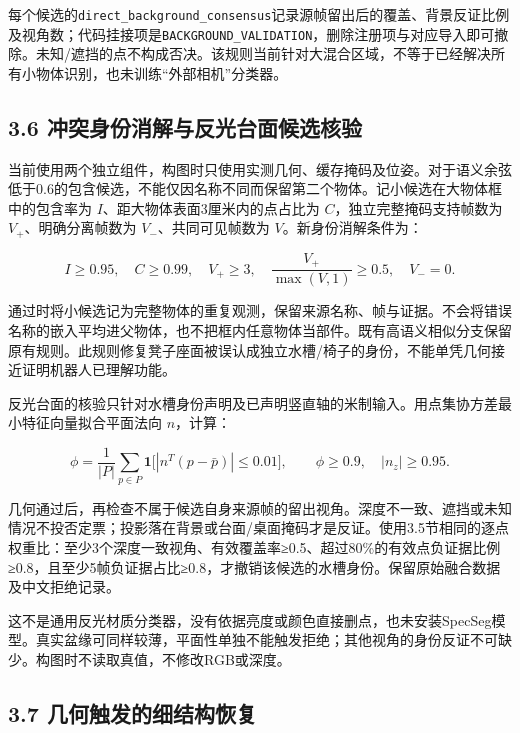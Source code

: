 \documentclass[UTF8,fontset=fandol]{ctexart}
\begin{document}
每个候选的\texttt{direct\_\allowbreak{}background\_\allowbreak{}consensus}记录源帧留出后的覆盖、背景反证比例及视角数；代码挂接项是\texttt{BACKGROUND\_\allowbreak{}VALIDATION}，删除注册项与对应导入即可撤除。未知/遮挡的点不构成否决。该规则当前针对大混合区域，不等于已经解决所有小物体识别，也未训练“外部相机”分类器。



\subsection*{3.6 冲突身份消解与反光台面候选核验}

当前使用两个独立组件，构图时只使用实测几何、缓存掩码及位姿。对于语义余弦低于0.6的包含候选，不能仅因名称不同而保留第二个物体。记小候选在大物体框中的包含率为 $I$、距大物体表面3厘米内的点占比为 $C$，独立完整掩码支持帧数为 $V_+$、明确分离帧数为 $V_-$、共同可见帧数为 $V$。新身份消解条件为：



\[
I\ge0.95,\quad C\ge0.99,\quad V_+\ge3,\quad
\frac{V_+}{\max(V,1)}\ge0.5,\quad V_-=0.
\]

通过时将小候选记为完整物体的重复观测，保留来源名称、帧与证据。不会将错误名称的嵌入平均进父物体，也不把框内任意物体当部件。既有高语义相似分支保留原有规则。此规则修复凳子座面被误认成独立水槽/椅子的身份，不能单凭几何接近证明机器人已理解功能。



反光台面的核验只针对水槽身份声明及已声明竖直轴的米制输入。用点集协方差最小特征向量拟合平面法向 $n$，计算：



\[
\phi=\frac{1}{|P|}\sum_{p\in P}\mathbf1\bigl[|n^T(p-\bar p)|\le0.01\bigr],
\qquad \phi\ge0.9,\quad |n_z|\ge0.95.
\]

几何通过后，再检查不属于候选自身来源帧的留出视角。深度不一致、遮挡或未知情况不投否定票；投影落在背景或台面/桌面掩码才是反证。使用3.5节相同的逐点权重比：至少3个深度一致视角、有效覆盖率≥0.5、超过80\%的有效点负证据比例≥0.8，且至少5帧负证据占比≥0.8，才撤销该候选的水槽身份。保留原始融合数据及中文拒绝记录。



这不是通用反光材质分类器，没有依据亮度或颜色直接删点，也未安装SpecSeg模型。真实盆缘可同样较薄，平面性单独不能触发拒绝；其他视角的身份反证不可缺少。构图时不读取真值，不修改RGB或深度。



\subsection*{3.7 几何触发的细结构恢复}
\end{document}
